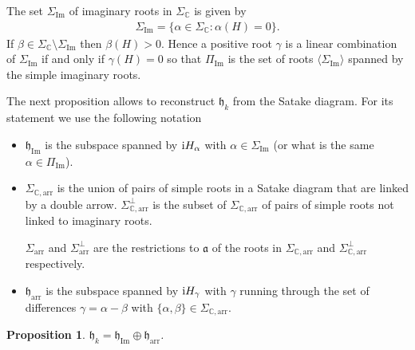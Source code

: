 \documentclass[pdftex]{sigma}
\numberwithin{equation}{section}
\newtheorem{Proposition}[Theorem]{Proposition}
 { \theoremstyle{definition}
\newtheorem{Definition}[Theorem]{Definition}
\newtheorem{Note}[Theorem]{Note}
\newtheorem{Example}[Theorem]{Example}
\newtheorem{Remark}[Theorem]{Remark} }
\newcommand{\func}[1]{\operatorname{#1}}
\begin{document}
The set $\Sigma _{\func{Im}}$ of imaginary roots in $\Sigma _{\mathbb{C}}$ is given by
\begin{gather*}
\Sigma _{\func{Im}}=\{\alpha \in \Sigma _{\mathbb{C}}\colon \alpha (H)=0\}.
\end{gather*}If $\beta \in \Sigma _{\mathbb{C}}\setminus \Sigma _{\func{Im}}$ then $\beta (H) >0$. Hence a positive root $\gamma $ is a linear combination of $\Sigma _{\func{Im}}$ if and only if $\gamma (H) =0$ so that $\Pi _{\func{Im}}$ is the set of roots $\langle \Sigma _{\func{Im}}\rangle $ spanned by the simple imaginary roots.

The next proposition allows to reconstruct $\mathfrak{h}_{k}$ from the Satake diagram. For its statement we use the following notation

\begin{itemize}\itemsep=0pt
\item $\mathfrak{h}_{\func{Im}}$ is the subspace spanned by ${\rm i}H_{\alpha }$ with $\alpha \in \Sigma _{\func{Im}}$ (or what is the same $\alpha \in \Pi _{\func{Im}}$).

\item $\Sigma _{\mathbb{C},\mathrm{arr}}$ is the union of pairs of simple roots in a Satake diagram that are linked by a double arrow. $\Sigma _{\mathbb{C},\mathrm{arr}}^{\bot }$ is the subset of $\Sigma _{\mathbb{C},\mathrm{arr}}$ of pairs of simple roots not linked to imaginary roots.

$\Sigma _{\mathrm{arr}}$ and $\Sigma _{\mathrm{arr}}^{\bot }$ are the restrictions to $\mathfrak{a}$ of the roots in $\Sigma _{\mathbb{C},\mathrm{arr}}$ and $\Sigma _{\mathbb{C},\mathrm{arr}}^{\bot }$ respectively.

\item $\mathfrak{h}_{\mathrm{arr}}$ is the subspace spanned by ${\rm i}H_{\gamma }$ with $\gamma $ running through the set of differences $\gamma =\alpha -\beta$ with $\{\alpha,\beta\} \in \Sigma _{\mathbb{C},\mathrm{arr}}$.
\end{itemize}

\begin{Proposition}\label{propHagak}$\mathfrak{h}_{k}=\mathfrak{h}_{\func{Im}}\oplus \mathfrak{h}_{\mathrm{arr}}$.
\end{Proposition}
\end{document}
